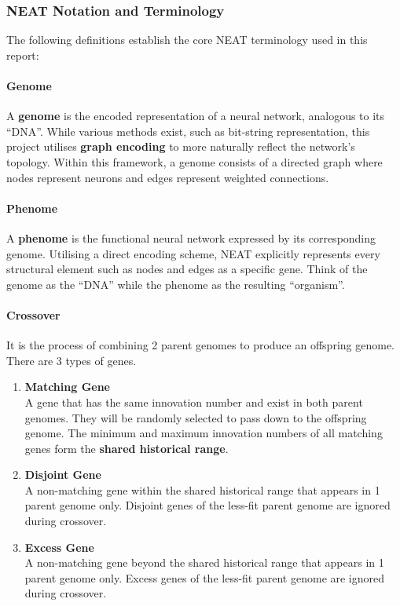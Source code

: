 \documentclass{article}
\begin{document}
\subsubsection{NEAT Notation and Terminology}
The following definitions establish the core NEAT terminology used in this report: 

\paragraph{Genome}
A \textbf{genome} is the encoded representation of a neural network, analogous to its ``DNA''. While various methods exist, such as bit-string representation, this project utilises \textbf{graph encoding} to more naturally reflect the network's topology. Within this framework, a genome consists of a directed graph where nodes represent neurons and edges represent weighted connections. 

\paragraph{Phenome}
A \textbf{phenome} is the functional neural network expressed by its corresponding genome. Utilising a direct encoding scheme, NEAT explicitly represents every structural element such as nodes and edges as a specific gene. Think of the genome as the ``DNA'' while the phenome as the resulting ``organism''. 

\paragraph{Crossover}
It is the process of combining 2 parent genomes to produce an offspring genome. There are 3 types of genes. 

\begin{enumerate}
    \item \textbf{Matching Gene} \\
    A gene that has the same innovation number and exist in both parent genomes. They will be randomly selected to pass down to the offspring genome. The minimum and maximum innovation numbers of all matching genes form the \textbf{shared historical range}. 

    \item \textbf{Disjoint Gene} \\
    A non-matching gene within the shared historical range that appears in 1 parent genome only. Disjoint genes of the less-fit parent genome are ignored during crossover. 

    \item \textbf{Excess Gene} \\
    A non-matching gene beyond the shared historical range that appears in 1 parent genome only. Excess genes of the less-fit parent genome are ignored during crossover. 
\end{enumerate}
\end{document}
